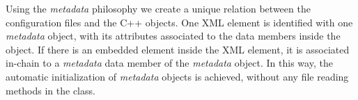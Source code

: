 Using the \emph{metadata} philosophy we create a unique relation between the configuration files and the C++ objects. One XML element is identified with one \emph{metadata} object, with its attributes associated to the data members inside the object. If there is an embedded element inside the XML element, it is associated in-chain to a \emph{metadata} data member of the \emph{metadata} object. In this way, the automatic initialization of \emph{metadata} objects is achieved, without any file reading methods in the class.










